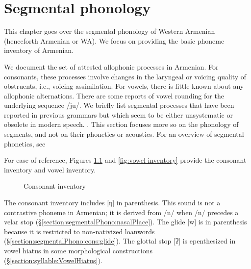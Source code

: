 \chapter{Segmental phonology}\label{chapter:segmentalPhono}
This chapter goes over the segmental phonology of Western Armenian (henceforth Armenian or WA). We focus on providing the basic phoneme inventory of Armenian. 


We document the set of attested allophonic processes in Armenian. For consonants, these processes involve changes in the laryngeal or voicing quality of obstruents, i.e., voicing assimilation. For vowels, there is little known about any allophonic alternations. There are some reports of vowel rounding for the underlying sequence /ju/. We briefly list segmental processes that have been reported in previous grammars but which seem to be either unsystematic or obsolete in modern speech. 
.
This section focuses more so on the phonology of segments, and not on their phonetics or acoustics. For an overview of segmental phonetics, see \citet{Seyfarth-JIPAArmenian}


For ease of reference, Figures \ref{tab:cons inventory} and \ref{fig:vowel inventory} provide the consonant inventory and vowel inventory. 

\begin{figure}[H]
	\centering 
	\caption{Consonant inventory}\label{tab:cons inventory}
\end{figure}

The consonant inventory includes [ŋ] in parenthesis. This sound is not a contrastive phoneme in Armenian; it is derived from /n/ when /n/ precedes a velar stop (\S\ref{section:segmentalPhono:nasalPlace}). The glide [w] is in parenthesis because it is restricted to non-nativized loanwords (\S\ref{section:segmentalPhono:cons:glide}). The glottal stop [ʔ] is epenthesized in vowel hiatus in some morphological constructions (\S\ref{section:syllable:VowelHiatus}). 


